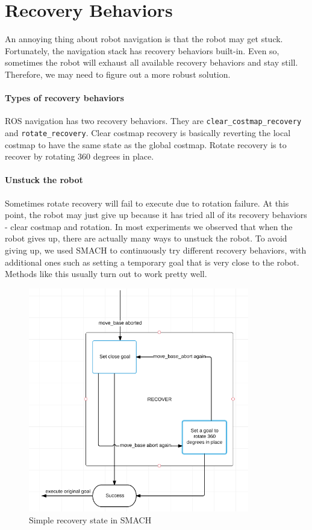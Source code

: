 \documentclass[12pt]{article}
\begin{document}
\section{Recovery Behaviors}
An annoying thing about robot navigation is that the robot may get stuck. Fortunately, the navigation stack has recovery behaviors built-in. Even so, sometimes the robot will exhaust all available recovery behaviors and stay still. Therefore, we may need to figure out a more robust solution.

\paragraph{Types of recovery behaviors} ROS navigation has two recovery behaviors. They are \texttt{clear\_costmap\_recovery} and \texttt{rotate\_recovery}. Clear costmap recovery is basically reverting the local costmap to have the same state as the global costmap. Rotate recovery is to recover by
rotating 360 degrees in place. 

\paragraph{Unstuck the robot} Sometimes rotate recovery will fail to execute due to rotation failure. At this point, the robot may just give up because it has tried
all of its recovery behaviors - clear costmap and rotation. In most experiments we observed that when the robot gives up, there are actually many ways to unstuck the robot.
To avoid giving up, we used SMACH to continuously try different recovery behaviors, with additional ones such as setting a temporary goal that is very close to the robot. Methods
like this usually turn out to work pretty well.

\begin{figure}[!h]
    \begin{center}
        \includegraphics[width=26em]{Recovery.png} \caption{Simple recovery state in SMACH}
    \end{center}
\end{figure}
\end{document}
